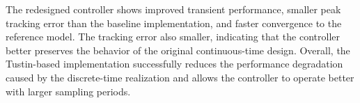 \noindent The redesigned controller shows improved transient performance, smaller peak tracking error than the baseline implementation, and faster convergence to the reference model.
The tracking error also smaller, indicating that the controller
better preserves the behavior of the original continuous-time design. Overall, the Tustin-based implementation successfully
reduces the performance degradation caused by the discrete-time realization and
allows the controller to operate better with larger sampling periods.

\bigskip